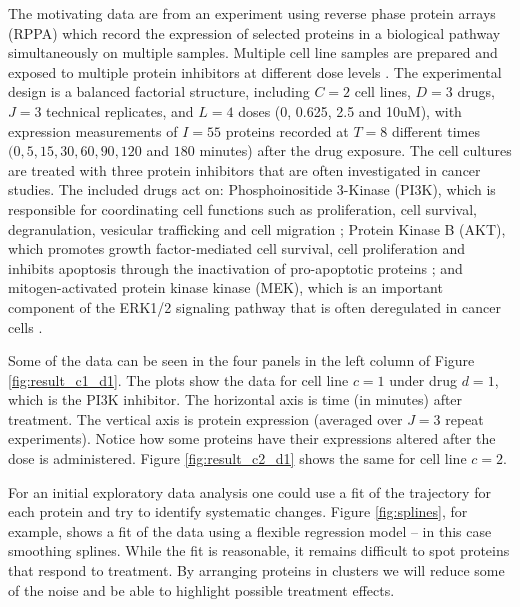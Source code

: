The motivating data are from an experiment using reverse phase protein
arrays (RPPA) which record the expression of selected proteins in a
biological pathway simultaneously on multiple samples. Multiple cell line
samples are prepared and exposed to multiple protein inhibitors
at different dose levels \citep{rppa_ref}.
The experimental design is a balanced factorial structure, including $C = 2$ cell
lines, $D = 3$ drugs, $J = 3$ technical replicates, and $L = 4$ doses (0,
0.625, 2.5 and 10uM), with expression measurements of $I=55$ proteins
recorded at $T = 8$ different times $(0, 5, 15, 30, 60, 90, 120$ and $180$
minutes) after the drug exposure.
The cell cultures are treated with three protein inhibitors that are often
investigated in cancer studies. The included drugs act on:
Phosphoinositide 3-Kinase (PI3K), which is responsible for coordinating
cell functions such as proliferation, cell survival, degranulation,
vesicular trafficking and cell migration \citep{pik3_ref}; Protein Kinase
B (AKT), which promotes growth factor-mediated cell survival, cell
proliferation and inhibits apoptosis through the inactivation of
pro-apoptotic proteins \citep{akt_ref}; and mitogen-activated protein
kinase kinase (MEK), which is an important component of the ERK1/2
signaling pathway that is often deregulated in cancer cells
\citep{mek_ref}.

Some of the data can be seen in the four panels in the left column of 
Figure \ref{fig:result_c1_d1}. The plots show the data for cell line
$c=1$ under drug $d=1$, which is the PI3K inhibitor. The horizontal
axis is time (in minutes) after treatment. The vertical axis is
protein expression (averaged over $J=3$ repeat experiments).
Notice how some proteins have their expressions altered after the dose
is administered.
Figure \ref{fig:result_c2_d1} shows the same for cell line $c=2$.

For an initial exploratory data analysis one could use a fit of the
trajectory for each protein and try to identify systematic changes. Figure \ref{fig:splines}, for example, shows a fit of the data using a
flexible regression model -- in this case smoothing splines. While the fit is reasonable, it remains difficult to spot proteins that respond to treatment.
By arranging proteins in clusters we will reduce some of the noise and
be able to highlight possible treatment effects.




